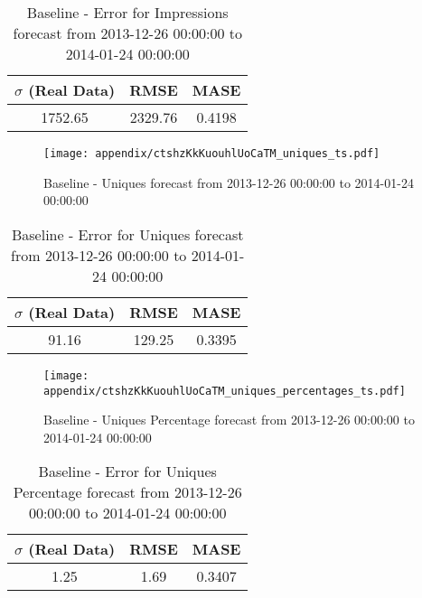\begin{table}[H]
\centering
\footnotesize
\begin{tabular}{ccc}
$\sigma$ (Real Data) & RMSE & MASE   \\ \hline
1752.65 & 2329.76 & 0.4198 \\
\end{tabular}

\vspace{0.5cm}

\caption{
Baseline - Error for Impressions forecast from 2013-12-26 00:00:00 to 2014-01-24 00:00:00}
\end{table}

\begin{figure}[H] \begin{center} \leavevmode
\texttt{[image: appendix/ctshzKkKuouhlUoCaTM\_uniques\_ts.pdf]} \caption{
Baseline - Uniques forecast from 2013-12-26 00:00:00 to 2014-01-24 00:00:00} \label{fig:appendix/ctshzKkKuouhlUoCaTM_uniques_ts.pdf} \end{center}
\end{figure}

\begin{table}[H]
\centering
\footnotesize
\begin{tabular}{ccc}
$\sigma$ (Real Data) & RMSE & MASE   \\ \hline
91.16 & 129.25 & 0.3395 \\
\end{tabular}

\vspace{0.5cm}

\caption{
Baseline - Error for Uniques forecast from 2013-12-26 00:00:00 to 2014-01-24 00:00:00}
\end{table}

\begin{figure}[H] \begin{center} \leavevmode
\texttt{[image: appendix/ctshzKkKuouhlUoCaTM\_uniques\_percentages\_ts.pdf]} \caption{
Baseline - Uniques Percentage forecast from 2013-12-26 00:00:00 to 2014-01-24 00:00:00} \label{fig:appendix/ctshzKkKuouhlUoCaTM_uniques_percentages_ts.pdf} \end{center}
\end{figure}

\begin{table}[H]
\centering
\footnotesize
\begin{tabular}{ccc}
$\sigma$ (Real Data) & RMSE & MASE   \\ \hline
1.25 & 1.69 & 0.3407 \\
\end{tabular}

\vspace{0.5cm}

\caption{
Baseline - Error for Uniques Percentage forecast from 2013-12-26 00:00:00 to 2014-01-24 00:00:00}
\end{table}

